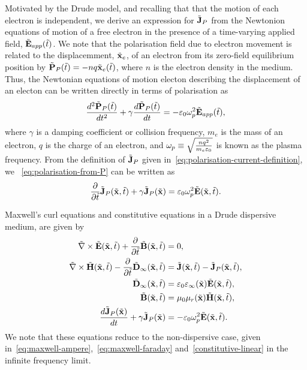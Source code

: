 Motivated by the Drude model, and recalling that that the motion of each
electron is independent, we derive an expression for $\tilde{\mathbf{J}}_P$ from the
Newtonion equations of motion of a free electron in the presence of a
time-varying applied field, $\tilde{\mathbf{E}}_{app}(\tilde{t})$. We note that the
polarisation field due to electron movement is related to the displacemment,
$\tilde{\mathbf{x}}_e$, of an electron from its zero-field equilibrium position by $
\tilde{\mathbf{P}}_P(\tilde{t}) = - n q \tilde{\mathbf{x}}_e(\tilde{t}) $, where $n$ is the
electron density in the medium. Thus, the Newtonian equations of motion electon
describing the displacement of an electon can be written directly in terms of
polarisation as
\begin{equation}
  \label{eq:equations-of-motion-electron}
  \frac{d^2 \tilde{\mathbf{P}}_P(\tilde{t}) }{dt^2} + \gamma \frac{d \tilde{\mathbf{P}}_P(\tilde{t}) }{dt} = - \varepsilon_0 \omega_p^2 \tilde{\mathbf{E}}_{app}(\tilde{t}),
\end{equation}
where $\gamma$ is a damping coefficient or collision frequency, $m_e$ is the
mass of an electron, $q$ is the charge of an electron, and $\omega_p \equiv
\sqrt{\frac{n q^2}{m_e \varepsilon_0}}$ is known as the plasma frequency.
From the definition of $\tilde{\mathbf{J}}_P$ given
in~\eqref{eq:polarisation-current-definition}, we
~\eqref{eq:polarisation-from-P} can be written as
\begin{equation}
  \frac{\partial}{\partial \tilde{t} } \tilde{\mathbf{J}}_P(\tilde{\mathbf{x}},\tilde{t}) + \gamma \tilde{\mathbf{J}}_P(\tilde{\mathbf{x}}) = \varepsilon_0 \omega_p^2 \tilde{\mathbf{E}}(\tilde{\mathbf{x}},\tilde{t}).
  \label{eq:pol-current-ADE}
\end{equation}

Maxwell's curl equations and constitutive equations in a Drude dispersive
medium, are given by
\begin{subequations}
  \label{eq:dispersive-maxwell-system}
  \begin{align}
    \tilde{\nabla} \times \tilde{\mathbf{E}}(\tilde{\mathbf{x}},\tilde{t}) + \frac{\partial}{\partial \tilde{t} }  \tilde{\mathbf{B}}(\tilde{\mathbf{x}}, \tilde{t})&= 0, \\
    \tilde{\nabla} \times \tilde{\mathbf{H}}(\tilde{\mathbf{x}},\tilde{t}) - \frac{\partial}{\partial \tilde{t} }  \tilde{\mathbf{D}}_{\infty}(\tilde{\mathbf{x}}, \tilde{t})&= \tilde{\mathbf{J}}(\tilde{\mathbf{x}},\tilde{t}) - \tilde{\mathbf{J}}_P(\tilde{\mathbf{x}},\tilde{t}), \\
    \tilde{\mathbf{D}}_{\infty}(\tilde{\mathbf{x}},\tilde{t}) &= \varepsilon_0 \varepsilon_{\infty}(\tilde{\mathbf{x}}) \tilde{\mathbf{E}}(\tilde{\mathbf{x}},\tilde{t}), \\
    \tilde{\mathbf{B}}(\tilde{\mathbf{x}},\tilde{t}) &= \mu_0 \mu_r(\tilde{\mathbf{x}}) \tilde{\mathbf{H}}(\tilde{\mathbf{x}},\tilde{t}), \\
    \frac{d \tilde{\mathbf{J}}_P(\tilde{\mathbf{x}})}{dt} + \gamma \tilde{\mathbf{J}}_P(\tilde{\mathbf{x}}) &= - \varepsilon_0 \omega_p^2 \tilde{\mathbf{E}}(\tilde{\mathbf{x}}, \tilde{t}) . \label{eq:maxwell-dispersive-ADE}
  \end{align}
\end{subequations}
We note that these equations reduce to the non-dispersive case, given
in~\eqref{eq:maxwell-ampere},~\eqref{eq:maxwell-faraday}
and~\eqref{constitutive-linear} in the infinite frequency limit.

